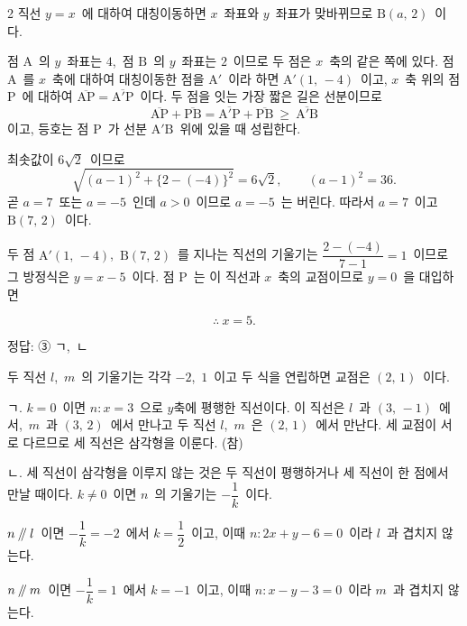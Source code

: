 \documentclass[10pt,fleqn]{article}
\newcommand{\para}{\mathbin{/\mskip-5mu/}}
\begin{document}
\begin{multicols*}{2}
직선 $y=x$\ 에 대하여 대칭이동하면 $x$\ 좌표와 $y$\ 좌표가 맞바뀌므로 $\mathrm{B}(a,\,2)$\ 이다.

점 $\mathrm{A}$\ 의 $y$\ 좌표는 $4$,\ 점 $\mathrm{B}$\ 의 $y$\ 좌표는 $2$\ 이므로 두 점은 $x$\ 축의 같은 쪽에 있다. 점 $\mathrm{A}$\ 를 $x$\ 축에 대하여 대칭이동한 점을 $\mathrm{A}'$\ 이라 하면 $\mathrm{A}'(1,\,-4)$\ 이고, $x$\ 축 위의 점 $\mathrm{P}$\ 에 대하여 $\overline{\mathrm{AP}}=\overline{\mathrm{A}'\mathrm{P}}$\ 이다. 두 점을 잇는 가장 짧은 길은 선분이므로
$$\overline{\mathrm{AP}}+\overline{\mathrm{PB}}=\overline{\mathrm{A}'\mathrm{P}}+\overline{\mathrm{PB}}\ \ge\ \overline{\mathrm{A}'\mathrm{B}}$$
이고, 등호는 점 $\mathrm{P}$\ 가 선분 $\mathrm{A}'\mathrm{B}$\ 위에 있을 때 성립한다.

최솟값이 $6\sqrt{2}$\ 이므로
$$\sqrt{(a-1)^{2}+\{2-(-4)\}^{2}}=6\sqrt{2},\qquad (a-1)^{2}=36.$$
곧 $a=7$\ 또는 $a=-5$\ 인데 $a>0$\ 이므로 $a=-5$\ 는 버린다. 따라서 $a=7$\ 이고 $\mathrm{B}(7,\,2)$\ 이다.

두 점 $\mathrm{A}'(1,\,-4)$,\ $\mathrm{B}(7,\,2)$\ 를 지나는 직선의 기울기는 $\dfrac{2-(-4)}{7-1}=1$\ 이므로 그 방정식은 $y=x-5$\ 이다. 점 $\mathrm{P}$\ 는 이 직선과 $x$\ 축의 교점이므로 $y=0$\ 을 대입하면

$$\therefore\ x=5.$$


\begin{dmanswerbox}
정답: ③ ㄱ,\ ㄴ
\end{dmanswerbox}

두 직선 $l$,\ $m$\ 의 기울기는 각각 $-2$,\ $1$\ 이고 두 식을 연립하면 교점은 $(2,\,1)$\ 이다.

ㄱ. $k=0$\ 이면 $n:x=3$\ 으로 $y$축에 평행한 직선이다. 이 직선은 $l$\ 과 $(3,\,-1)$\ 에서,\ $m$\ 과 $(3,\,2)$\ 에서 만나고 두 직선 $l$,\ $m$\ 은 $(2,\,1)$\ 에서 만난다. 세 교점이 서로 다르므로 세 직선은 삼각형을 이룬다. (참)

ㄴ. 세 직선이 삼각형을 이루지 않는 것은 두 직선이 평행하거나 세 직선이 한 점에서 만날 때이다. $k\ne 0$\ 이면 $n$\ 의 기울기는 $-\dfrac1k$\ 이다.

$n\para l$\ 이면 $-\dfrac1k=-2$\ 에서 $k=\dfrac12$\ 이고, 이때 $n:2x+y-6=0$\ 이라 $l$\ 과 겹치지 않는다.

$n\para m$\ 이면 $-\dfrac1k=1$\ 에서 $k=-1$\ 이고, 이때 $n:x-y-3=0$\ 이라 $m$\ 과 겹치지 않는다.


\end{multicols*}
\end{document}
